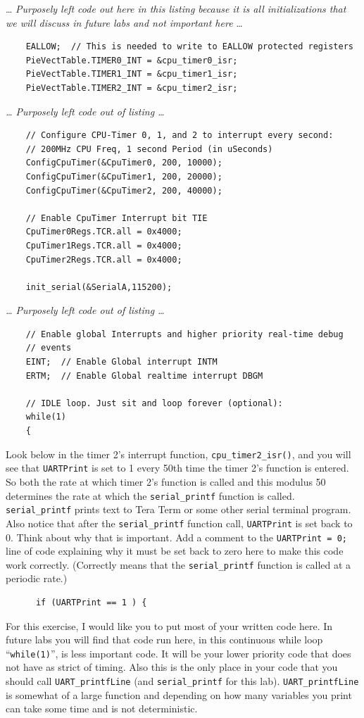 \documentclass[11pt]{article}
\begin{document}
%
… \textit{Purposely left code out here in this listing because it is all initializations that we will discuss in future labs and not important here} …
%
\begin{verbatim}
    EALLOW;  // This is needed to write to EALLOW protected registers
    PieVectTable.TIMER0_INT = &cpu_timer0_isr;
    PieVectTable.TIMER1_INT = &cpu_timer1_isr;
    PieVectTable.TIMER2_INT = &cpu_timer2_isr;
\end{verbatim}
%
\textit{… Purposely left code out of listing …}
%
\begin{verbatim}
    // Configure CPU-Timer 0, 1, and 2 to interrupt every second:
    // 200MHz CPU Freq, 1 second Period (in uSeconds)
    ConfigCpuTimer(&CpuTimer0, 200, 10000);
    ConfigCpuTimer(&CpuTimer1, 200, 20000);
    ConfigCpuTimer(&CpuTimer2, 200, 40000);

    // Enable CpuTimer Interrupt bit TIE
    CpuTimer0Regs.TCR.all = 0x4000;
    CpuTimer1Regs.TCR.all = 0x4000;
    CpuTimer2Regs.TCR.all = 0x4000;

    init_serial(&SerialA,115200);
\end{verbatim}
%
\textit{… Purposely left code out of listing …}
%
\begin{verbatim}
    // Enable global Interrupts and higher priority real-time debug
    // events
    EINT;  // Enable Global interrupt INTM
    ERTM;  // Enable Global realtime interrupt DBGM

    // IDLE loop. Just sit and loop forever (optional):
    while(1)
    {
\end{verbatim}
%
Look below in the timer 2’s interrupt function, \texttt{cpu_timer2_isr()}, and you will see that \texttt{UARTPrint} is set to 1 every 50th time the timer 2’s function is entered. So both the rate at which timer 2’s function is called and this modulus 50 determines the rate at which the \texttt{serial_printf} function is called. \texttt{serial_printf} prints text to Tera Term or some other serial terminal program. Also notice that after the \texttt{serial_printf} function call, \texttt{UARTPrint} is set back to 0. Think about why that is important. Add a comment to the \texttt{UARTPrint = 0;} line of code explaining why it must be set back to zero here to make this code work correctly. (Correctly means that the \texttt{serial_printf} function is called at a periodic rate.)
%
\begin{verbatim}
      if (UARTPrint == 1 ) {
\end{verbatim}
%
For this exercise, I would like you to put most of your written code here. In future labs you will find that code run here, in this continuous while loop “\texttt{while(1)}”, is less important code. It will be your lower priority code that does not have as strict of timing. Also this is the only place in your code that you should call \texttt{UART_printfLine} (and \texttt{serial_printf} for this lab). \texttt{UART_printfLine} is somewhat of a large function and depending on how many variables you print can take some time and is not deterministic.
\end{document}
